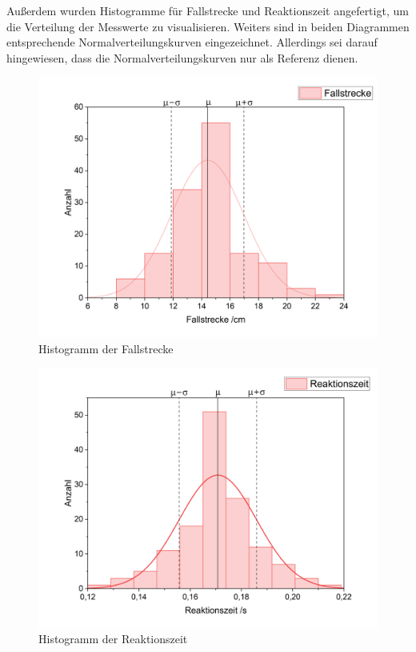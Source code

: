 \documentclass[a4paper,12pt]{article}
\begin{document}
Außerdem wurden Histogramme für Fallstrecke und Reaktionszeit angefertigt, um die Verteilung
der Messwerte zu visualisieren. Weiters sind in beiden Diagrammen entsprechende Normalverteilungskurven
eingezeichnet. Allerdings sei darauf hingewiesen, dass die Normalverteilungskurven nur als Referenz dienen.

\begin{figure}[H]
    \label{Abb:HistogrammFallstrecke}
    \centering
    \includegraphics[width=15cm]{bilder/HistogrammFallstrecke.png}      %
    \caption{Histogramm der Fallstrecke}                                %
\end{figure}

\vfill

\begin{figure}[H]
    \label{Abb:HistogrammReaktionszeit}
    \centering
    \includegraphics[width=15cm]{bilder/HistogrammReaktionszeit.png}    %
    \caption{Histogramm der Reaktionszeit}                              %
\end{figure}
\end{document}
